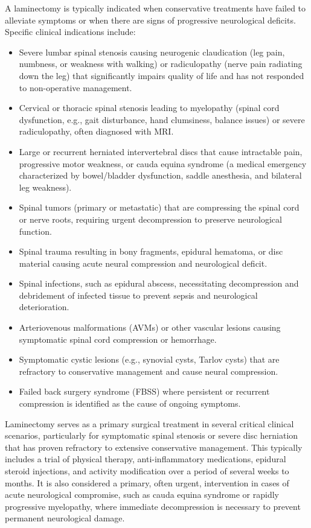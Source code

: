 A laminectomy is typically indicated when conservative treatments have failed to alleviate symptoms or when there are signs of progressive neurological deficits. Specific clinical indications include:
\begin{itemize}
  \item Severe lumbar spinal stenosis causing neurogenic claudication (leg pain, numbness, or weakness with walking) or radiculopathy (nerve pain radiating down the leg) that significantly impairs quality of life and has not responded to non-operative management.
  \item Cervical or thoracic spinal stenosis leading to myelopathy (spinal cord dysfunction, e.g., gait disturbance, hand clumsiness, balance issues) or severe radiculopathy, often diagnosed with MRI.
  \item Large or recurrent herniated intervertebral discs that cause intractable pain, progressive motor weakness, or cauda equina syndrome (a medical emergency characterized by bowel/bladder dysfunction, saddle anesthesia, and bilateral leg weakness).
  \item Spinal tumors (primary or metastatic) that are compressing the spinal cord or nerve roots, requiring urgent decompression to preserve neurological function.
  \item Spinal trauma resulting in bony fragments, epidural hematoma, or disc material causing acute neural compression and neurological deficit.
  \item Spinal infections, such as epidural abscess, necessitating decompression and debridement of infected tissue to prevent sepsis and neurological deterioration.
  \item Arteriovenous malformations (AVMs) or other vascular lesions causing symptomatic spinal cord compression or hemorrhage.
  \item Symptomatic cystic lesions (e.g., synovial cysts, Tarlov cysts) that are refractory to conservative management and cause neural compression.
  \item Failed back surgery syndrome (FBSS) where persistent or recurrent compression is identified as the cause of ongoing symptoms.
\end{itemize}

Laminectomy serves as a primary surgical treatment in several critical clinical scenarios, particularly for symptomatic spinal stenosis or severe disc herniation that has proven refractory to extensive conservative management. This typically includes a trial of physical therapy, anti-inflammatory medications, epidural steroid injections, and activity modification over a period of several weeks to months. It is also considered a primary, often urgent, intervention in cases of acute neurological compromise, such as cauda equina syndrome or rapidly progressive myelopathy, where immediate decompression is necessary to prevent permanent neurological damage.

